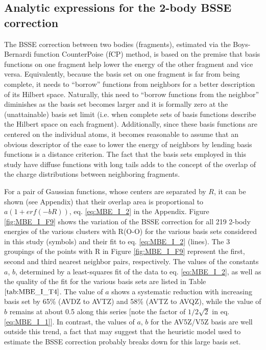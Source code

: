 \documentclass[11pt, proquest]{uwthesis}[2020/02/24]
\newcommand{\textapprox}{\raisebox{0.5ex}{\texttildelow}}
\begin{document}
\subsection{Analytic expressions for the 2-body BSSE correction}

\par The BSSE correction between two bodies (fragments), estimated via the Boys-Bernardi function CounterPoise (fCP) method,\autocite{boys_calculation_1970} is based on the premise that basis functions on one fragment help lower the energy of the other fragment and vice versa. Equivalently, because the basis set on one fragment is far from being complete, it needs to “borrow” functions from neighbors for a better description of its Hilbert space. Naturally, this need to “borrow functions from the neighbor” diminishes as the basis set becomes larger and it is formally zero at the (unattainable) basis set limit (i.e. when complete sets of basis functions describe the Hilbert space on each fragment). Additionally, since these basis functions are centered on the individual atoms, it becomes reasonable to assume that an obvious descriptor of the ease to lower the energy of neighbors by lending basis functions is a distance criterion. The fact that the basis sets employed in this study have diffuse functions with long tails adds to the concept of the overlap of the charge distributions between neighboring fragments.

\par For a pair of Gaussian functions, whose centers are separated by $R$, it can be shown (see Appendix) that their overlap area is proportional to $a(1+erf(-bR))$, eq. \eqref{eq:MBE_I_2} in the Appendix. Figure \ref{fig:MBE_I_F9} shows the variation of the BSSE correction for all 219 2-body energies of the various clusters with R(O-O) for the various basis sets considered in this study (symbols) and their fit to eq. \eqref{eq:MBE_I_2} (lines). The 3 groupings of the points with R in Figure \ref{fig:MBE_I_F9} represent the first, second and third nearest neighbor pairs, respectively. The values of the constants $a$, $b$, determined by a least-squares fit of the data to eq. \eqref{eq:MBE_I_2}, as well as the quality of the fit for the various basis sets are listed in Table $\ref{tab:MBE_I_T4}$. The value of $a$ shows a systematic reduction with increasing basis set by \textapprox65\% (AVDZ to AVTZ) and \textapprox58\% (AVTZ to AVQZ), while the value of $b$ remains at about 0.5 along this series [note the factor of $1/2\sqrt{2}$ in eq. \eqref{eq:MBE_I_1}]. In contrast, the values of $a$, $b$ for the AV5Z/V5Z basis are well outside this trend, a fact that may suggest that the heuristic model used to estimate the BSSE correction probably breaks down for this large basis set.
\end{document}
